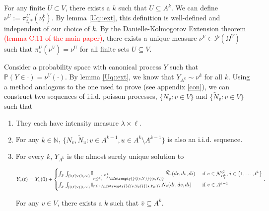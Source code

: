 \documentclass[12pt]{article}
\newcommand{\mb}{\mathbb}
\newcommand{\mc}{\mathcal}
\newcommand{\ov}{\overline}
\newcommand{\te}{\text}
\newcommand{\tr}{\textcolor{red}}
\newcommand{\ind}{\hspace{24pt}}
\newcommand{\pr}{\mb{P}}							%
\newcommand{\defeq}{:=}								%
\newcommand{\pmsr}{\mc{P}}							%
\newcommand{\sta}{\mc{X}}							%
\newcommand{\gneigh}[2]{\mc{N}^{#1}_{#2}}			%
\newcommand{\cl}[1]{\ov{#1}}						%
\newcommand{\indx}[1]{^{#1}}						%
\newcommand{\poiss}{N}								%
\newcommand{\leb}{\lambda}							%
\newcommand{\Sm}{\ell}								%
\newcommand{\rate}{r}								%
\newcommand{\proj}{\pi}								%
\newcommand{\poissv}[1]{_{#1}}						%
\newcommand{\vind}[1]{_{#1}}						%
\newcommand{\tme}[1]{(#1)}							%
\newcommand{\vpara}[1]{^{#1}}						%
\newcommand{\stpara}[1]{_{#1}}						%
\newcommand{\tpara}[1]{_{#1}}						%
\newcommand{\psf}{_*}								%
\newcommand{\tparapsf}[1]{_{#1,*}}					%
\newcommand{\psize}{\ell}							%
\newcommand{\tmepro}[3]{
\ifstrempty{#3}{
	\left(#1,#2\right)}{
	\left(#1,#2,#3\right)}}							%
\newcommand{\Xg}{Y}									%
\newcommand{\brate}{\alt{\rate}}					%
\newcommand{\alt}[1]{\tilde{#1}}					%
\newcommand{\mm}{\nu}								%
\newcommand{\vjpara}[2]{^{#1,#2}}					%
\begin{document}
For any finite \(U \subset V\), there exists a \(k\) such that \(U \subseteq A\indx{k}\). We can define \(\mm\vpara{U} \defeq \proj\tparapsf{t}\vpara{U}(\mm\indx{k}\tpara{t})\). By lemma \ref{Uq::ext}, this definition is well-defined and independent of our choice of \(k\). By the Danielle-Kolmogorov Extension theorem \tr{(lemma C.11 of the main paper)}, there exists a unique measure \(\mm\vpara{V} \in \pmsr(\Omega\vpara{V})\) such that \(\proj\psf\vpara{U}(\mm\vpara{V}) = \mm\vpara{U}\) for all finite sets \(U\subseteq V\).

\ind Consider a probability space with canonical process \(\Xg\) such that \(\pr(\Xg \in \cdot) = \mm\vpara{V}(\cdot)\). By lemma \ref{Uq::ext}, we know that \(\Xg\vind{A\indx{k}} \sim \mm\indx{k}\) for all \(k\). Using a method analogous to the one used to prove \cite[Proposition 14.7.1]{DalVer08} (see appendix \ref{con}), we can construct two sequences of i.i.d. poisson processes, \(\{\poiss\poissv{v}:v \in V\}\) and \(\{\alt{\poiss}\poissv{v}:v \in V\}\) such that 

\begin{enumerate}
\item They each have intensity measure \(\leb\times\Sm\).

\item For any \(k \in \mb{N}\), \(\{\poiss\poissv{v},\alt{\poiss}\poissv{u}: v \in A\indx{k-1},u\in A\indx{k}\setminus A\indx{k-1}\}\) is also an i.i.d. sequence.

\item For every \(k\), \(\Xg\vind{A\indx{k}}\) is the almost surely unique solution to 

\begin{equation}
\Xg\vind{v}\tme{t} = \Xg\vind{v}\tme{0} + 
\begin{cases}
\int_\sta\int_{(0,t]\times(0,\infty)} \mb{I}_{r \leq \brate\vjpara{v}{B\indx{k}_j}\stpara{i}\tmepro{s}{\Xg}{}}\,\alt{\poiss}\poissv{v}(dr,ds,di)& \te{ if } v \in \gneigh{G}{B\indx{k}_j}, j \in \{1,\dots,\psize\indx{k}\}\\
\int_\sta\int_{(0,t]\times(0,\infty)} \mb{I}_{r \leq \rate\stpara{i}\tmepro{s}{\Xg\vind{\cl{v}}}{}}\,\poiss\poissv{v}(dr,ds,di)&\te{ if } v \in A\indx{k-1}
\end{cases}.
\label{Uq::extcomb}
\end{equation}

For any \(v \in V\), there exists a \(k\) such that \(\cl{v}\subseteq A\indx{k}\). 
\end{enumerate}
\end{document}
